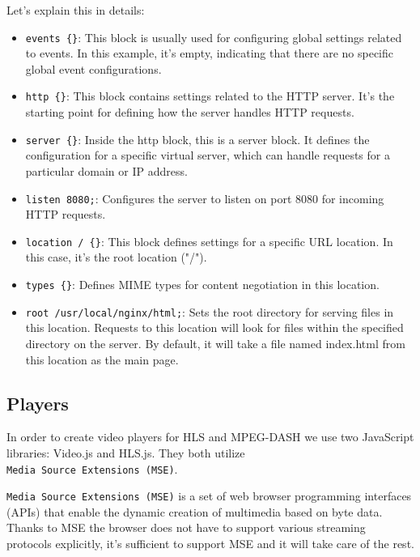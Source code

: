 \documentclass{article}
\begin{document}
Let's explain this in details:

\begin{itemize}
    \item \texttt{events \{\}}: This block is usually used for configuring global settings related to events. In this example, it's empty, indicating that there are no specific global event configurations.

    \item \texttt{http \{\}}: This block contains settings related to the HTTP server. It's the starting point for defining how the server handles HTTP requests.

    \item \texttt{server \{\}}: Inside the http block, this is a server block. It defines the configuration for a specific virtual server, which can handle requests for a particular domain or IP address.

    \item \texttt{listen 8080;}: Configures the server to listen on port 8080 for incoming HTTP requests.

    \item \texttt{location / \{\}}: This block defines settings for a specific URL location. In this case, it's the root location ("/").

    \item \texttt{types \{\}}: Defines MIME types for content negotiation in this location.

    \item \texttt{root /usr/local/nginx/html;}: Sets the root directory for serving files in this location. Requests to this location will look for files within the specified directory on the server. By default, it will take a file named index.html from this location as the main page.
\end{itemize}


\subsection{Players}\label{players}

In order to create video players for HLS and MPEG-DASH we use two
JavaScript libraries: Video.js and HLS.js. They both utilize
\texttt{Media\ Source\ Extensions\ (MSE)}.

\texttt{Media\ Source\ Extensions\ (MSE)} is a set of web browser
programming interfaces (APIs) that enable the dynamic creation of
multimedia based on byte data. Thanks to MSE the browser does not have
to support various streaming protocols explicitly, it's sufficient to
support MSE and it will take care of the rest.
\end{document}

